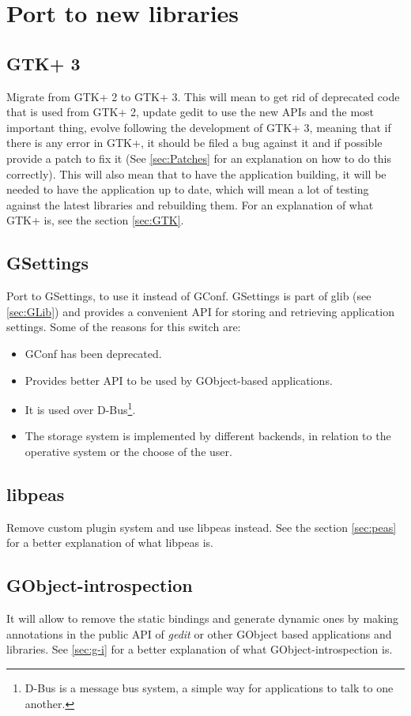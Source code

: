 
\section{Port to new libraries}\label{sec:NewLibraries}

\subsection{GTK+ 3}\label{sec:GTK3}

Migrate from GTK+ 2 to GTK+ 3. This will mean to get rid of deprecated code that is used from GTK+ 2, update gedit to use the new APIs and the most important thing, evolve following the development of GTK+ 3, meaning that if there is any error in GTK+, it should be filed a bug against it and if possible provide a patch to fix it (See \ref{sec:Patches} for an explanation on how to do this correctly). This will also mean that to have the application building, it will be needed to have the application up to date, which will mean a lot of testing against the latest libraries and rebuilding them. For an explanation of what GTK+ is, see the section \ref{sec:GTK}.

\subsection[GSettings]{GSettings\cite{website:gio}}\label{sec:GSettings}

Port to GSettings, to use it instead of GConf. GSettings is part of glib (see \ref{sec:GLib}) and provides a convenient API for storing and retrieving application settings. Some of the reasons for this switch are:
\begin{itemize}
  \item GConf has been deprecated.
  \item Provides better API to be used by GObject-based applications.
  \item It is used over D-Bus\footnote{D-Bus is a message bus system, a simple way for applications to talk to one another.}.
  \item The storage system is implemented by different backends, in relation to the operative system or the choose of the user.
\end{itemize}

\subsection{libpeas}\label{sec:libpeas}

Remove custom plugin system and use libpeas instead. See the section \ref{sec:peas} for a better explanation of what libpeas is.

\subsection{GObject-introspection}\label{sec:GObjectIntrospection}

It will allow to remove the static bindings and generate dynamic ones by making annotations in the public API of \emph{gedit} or other GObject based applications and libraries. See \ref{sec:g-i} for a better explanation of what GObject-introspection is.
